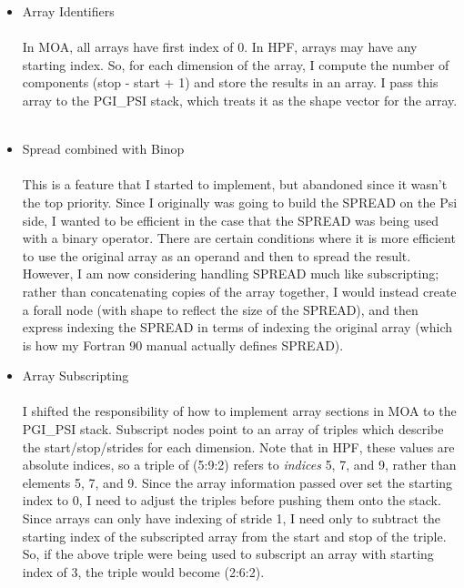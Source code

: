   \begin{itemize}
  \item  Array Identifiers\\ \\
  
  In MOA, all arrays have first index of 0.  In HPF, arrays may have any
  starting index.  So, for each dimension of the array, I compute the
  number of components (stop - start + 1) and store the results in an
  array.  I pass this array to the PGI_PSI stack, which treats it as
  the shape vector for the array.\\ \\

  \item  Spread combined with Binop\\ \\

  This is a feature that I started to implement, but abandoned since it
  wasn't the top priority.  Since I originally was going to build the
  SPREAD on the Psi side, I wanted to be efficient in the case that the
  SPREAD was being used with a binary operator.  There are certain conditions
  where it is more efficient to use the original array as an operand and
  then to spread the result.  However, I am now considering handling
  SPREAD much like subscripting; rather than concatenating copies of
  the array together, I would instead create a forall node (with shape to
  reflect the size of the SPREAD), and then express indexing the SPREAD in
  terms of indexing the original array (which is how my Fortran 90 manual
  actually defines SPREAD).

  \item  Array Subscripting\\ \\

  I shifted the responsibility of how to implement array sections in MOA
  to the PGI_PSI stack.  Subscript nodes point to an array of triples which
  describe the start/stop/strides for each dimension.  Note that in HPF,
  these values are absolute indices, so a triple of (5:9:2) refers to
  {\em indices }  5, 7, and 9, rather than elements 5, 7, and 9.  Since
  the array information passed over set the starting index to 0, I need
  to adjust the triples before pushing them onto the stack.  Since arrays
  can only have indexing of stride 1, I need only to subtract the starting
  index of the subscripted array from the start and stop of the triple.
  So, if the above triple were being used to subscript an array with
  starting index of 3, the triple would become (2:6:2). \\ \\


\end{itemize}
